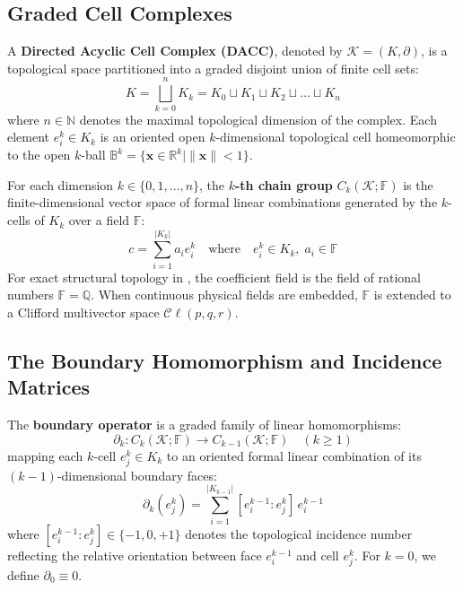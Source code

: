 \subsection{Graded Cell Complexes}
\begin{definition}
A \textbf{Directed Acyclic Cell Complex (DACC)}, denoted by $\mathcal{K} = (K, \partial)$, is a topological space partitioned into a graded disjoint union of finite cell sets:
\begin{equation}
    K = \bigsqcup_{k=0}^n K_k = K_0 \sqcup K_1 \sqcup K_2 \sqcup \dots \sqcup K_n
\end{equation}
where $n \in \mathbb{N}$ denotes the maximal topological dimension of the complex. Each element $e_i^k \in K_k$ is an oriented open $k$-dimensional topological cell homeomorphic to the open $k$-ball $\mathbb{B}^k = \{ \mathbf{x} \in \mathbb{R}^k \mid \|\mathbf{x}\| < 1 \}$.
\end{definition}

\begin{definition}
For each dimension $k \in \{0, 1, \dots, n\}$, the \textbf{$k$-th chain group} $C_k(\mathcal{K}; \mathbb{F})$ is the finite-dimensional vector space of formal linear combinations generated by the $k$-cells of $K_k$ over a field $\mathbb{F}$:
\begin{equation}
    c = \sum_{i=1}^{|K_k|} a_i e_i^k \quad \text{where} \quad e_i^k \in K_k, \; a_i \in \mathbb{F}
\end{equation}
For exact structural topology in \ToposLang{}, the coefficient field is the field of rational numbers $\mathbb{F} = \mathbb{Q}$. When continuous physical fields are embedded, $\mathbb{F}$ is extended to a Clifford multivector space $\mathcal{C}\ell(p,q,r)$.
\end{definition}

\subsection{The Boundary Homomorphism and Incidence Matrices}
\begin{definition}
The \textbf{boundary operator} is a graded family of linear homomorphisms:
\begin{equation}
    \partial_k : C_k(\mathcal{K}; \mathbb{F}) \longrightarrow C_{k-1}(\mathcal{K}; \mathbb{F}) \quad (k \ge 1)
\end{equation}
mapping each $k$-cell $e_j^k \in K_k$ to an oriented formal linear combination of its $(k-1)$-dimensional boundary faces:
\begin{equation}
    \partial_k(e_j^k) = \sum_{i=1}^{|K_{k-1}|} [e_i^{k-1} : e_j^k] \, e_i^{k-1}
\end{equation}
where $[e_i^{k-1} : e_j^k] \in \{-1, 0, +1\}$ denotes the topological incidence number reflecting the relative orientation between face $e_i^{k-1}$ and cell $e_j^k$. For $k=0$, we define $\partial_0 \equiv 0$.
\end{definition}

